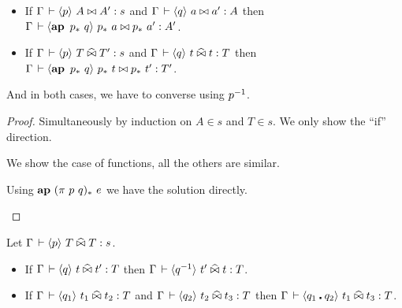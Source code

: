 \documentclass[a4paper,english]{lipics-utf8x}
\begin{document}
  \begin{lemma}
    \label{lem:s-conv}
    \leavevmode
    \begin{itemize}
      \item If $\Gamma \,\vdash \langle p \rangle~ A \mathrel{\bowtie} A' : s$ and
      $\Gamma \,\vdash \langle q \rangle~ a \mathrel{\bowtie} a' : A$ then
      $\Gamma \der \hideq{\ap p_*\ q} p_*\ a \Er p_*\ a' : A'$.
      \item If $\Gamma \,\vdash \langle p \rangle~ T \mathrel{\widehat{\bowtie}} T' : s$ and
      $\Gamma \,\vdash \langle q \rangle~ t \mathrel{\widehat{\bowtie}} t : T$ then
      $\Gamma \der \hideq{\ap p_*\ q} p_*\ t \Er p_*\ t' : T'$.
    \end{itemize}
    And in both cases, we have to converse using $p^{-1}$.
  \end{lemma}

  \begin{proof}
    Simultaneously by induction on $A \in s$ and $T \in s$.
    We only show the ``if'' direction.

    We show the case of functions, all the others are similar.

    \begin{caselist}
      \nextcase
      \begin{mathc}
      \end{mathc}
      \begin{mathc}
      \end{mathc}
      Using $\operatorname{\mathbf{ap}~} (\pi\ p\ q)_*\ e$ we have the solution directly.
    \end{caselist}
  \end{proof}

  \begin{lemma}
    \label{lem:s-per}
    Let $\Gamma \,\vdash \langle p \rangle~ T \mathrel{\widehat{\bowtie}} T : s$.
    \leavevmode
    \begin{itemize}
      \item If $\Gamma \,\vdash \langle q \rangle~ t \mathrel{\widehat{\bowtie}} t' : T$ then
      $\Gamma \,\vdash \langle q^{-1} \rangle~ t' \mathrel{\widehat{\bowtie}} t : T$.
      \item If $\Gamma \,\vdash \langle q_1 \rangle~ t_1 \mathrel{\widehat{\bowtie}} t_2 : T$ and
      $\Gamma \,\vdash \langle q_2 \rangle~ t_2 \mathrel{\widehat{\bowtie}} t_3 : T$
      then $\Gamma \,\vdash \langle q_1 \centerdot q_2 \rangle~ t_1 \mathrel{\widehat{\bowtie}} t_3 : T$.
    \end{itemize}
  \end{lemma}
\end{document}
